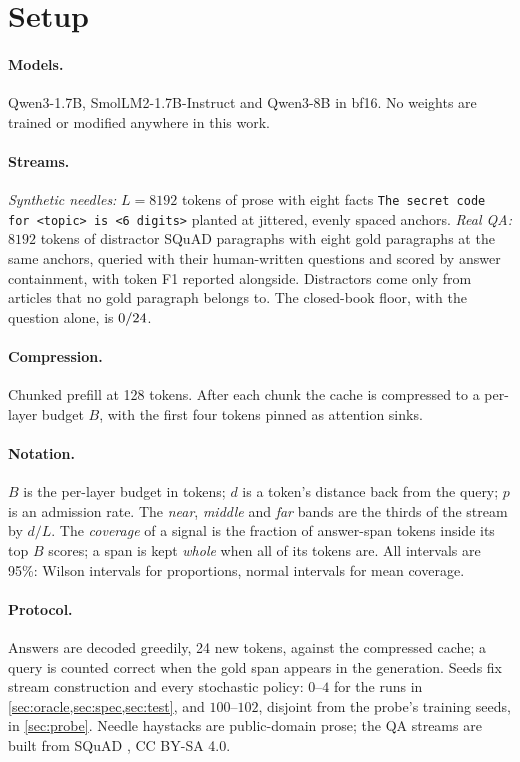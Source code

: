 \documentclass[10pt]{article}
\begin{document}
\section{Setup}\label{sec:setup}

\paragraph{Models.} Qwen3-1.7B, SmolLM2-1.7B-Instruct and Qwen3-8B in bf16. No
weights are trained or modified anywhere in this work.

\paragraph{Streams.} \emph{Synthetic needles:} $L{=}8192$ tokens of prose with
eight facts \texttt{The secret code for <topic> is <6 digits>} planted at
jittered, evenly spaced anchors. \emph{Real QA:} $8192$ tokens of distractor
SQuAD paragraphs with eight gold paragraphs at the same anchors, queried with
their human-written questions and scored by answer containment, with token F1
reported alongside. Distractors come only from articles that no gold paragraph
belongs to. The closed-book floor, with the question alone, is $0/24$.

\paragraph{Compression.} Chunked prefill at 128 tokens. After each chunk the cache
is compressed to a per-layer budget $B$, with the first four tokens pinned as
attention sinks.

\paragraph{Notation.} $B$ is the per-layer budget in tokens; $d$ is a token's
distance back from the query; $p$ is an admission rate. The \emph{near},
\emph{middle} and \emph{far} bands are the thirds of the stream by $d/L$. The
\emph{coverage} of a signal is the fraction of answer-span tokens inside its
top $B$ scores; a span is kept \emph{whole} when all of its tokens are. All
intervals are 95\%: Wilson intervals for proportions, normal intervals for
mean coverage.

\paragraph{Protocol.} Answers are decoded greedily, 24 new tokens, against
the compressed cache; a query is counted correct when the gold span appears in
the generation. Seeds fix stream construction and every stochastic policy:
$0$--$4$ for the runs in \cref{sec:oracle,sec:spec,sec:test}, and $100$--$102$,
disjoint from the probe's training seeds, in \cref{sec:probe}. Needle haystacks
are public-domain prose; the QA streams are built from SQuAD
\citep{rajpurkar2016squad}, CC BY-SA 4.0.
\end{document}
